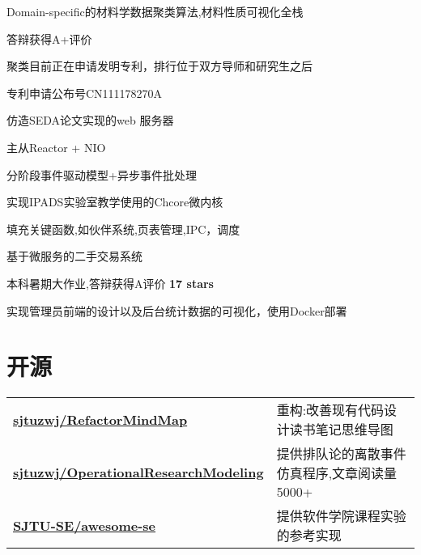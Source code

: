 \documentclass[]{deedy-resume-openfont}
\begin{document}
\begin{minipage}[t]{0.73\textwidth}
\begin{tightemize}
    \item Domain-specific的材料学数据聚类算法,材料性质可视化全栈
    \item 答辩获得A+评价
    \item 聚类目前正在申请发明专利，排行位于双方导师和研究生之后
	\item 专利申请公布号CN111178270A
    \end{tightemize}
\sectionsep


\begin{tightemize}
    \item 仿造SEDA论文实现的web 服务器
    \item 主从Reactor + NIO
    \item 分阶段事件驱动模型+异步事件批处理
    \end{tightemize}
\sectionsep



\begin{tightemize}
    \item 实现IPADS实验室教学使用的Chcore微内核
    \item 填充关键函数,如伙伴系统,页表管理,IPC，调度
    \end{tightemize}
\sectionsep

\begin{tightemize}
    \item 基于微服务的二手交易系统
    \item 本科暑期大作业,答辩获得A评价 \textbf{17 stars}
    \item 实现管理员前端的设计以及后台统计数据的可视化，使用Docker部署
    \end{tightemize}
\sectionsep


\section{开源}
\begin{tabular}{ll}
\href{https://github.com/sjtuzwj/RefactorMindMap}{\bf sjtuzwj/RefactorMindMap} & 重构:改善现有代码设计读书笔记思维导图 \\
\href{https://github.com/sjtuzwj/OperationalResearchModeling}{\bf sjtuzwj/OperationalResearchModeling} & 提供排队论的离散事件仿真程序,文章阅读量5000+\\
\href{https://github.com/SJTU-SE/awesome-se}{\bf SJTU-SE/awesome-se} & 提供软件学院课程实验的参考实现 \\
\end{tabular}
\sectionsep



\end{minipage} 
\end{document}

